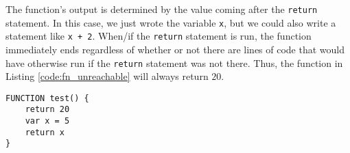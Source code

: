 \documentclass{article}
\begin{document}
The function's output is determined by the value coming after the \lstinline{return} statement.
In this case, we just wrote the variable \lstinline{x}, but we could also write a statement like \lstinline{x + 2}.
When/if the \lstinline{return} statement is run, the function immediately ends regardless of whether or not there are lines of code that would have otherwise run if the \lstinline{return} statement was not there.
Thus, the function in Listing \ref{code:fn_unreachable} will always return $20$.
\begin{lstlisting}[caption={Unreachable Code.}, label={code:fn_unreachable}]
FUNCTION test() {
    return 20
    var x = 5
    return x
}
\end{lstlisting}
\end{document}
